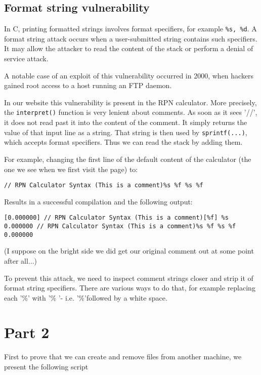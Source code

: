 \documentclass[11pt,journal]{article}
\begin{document}
	\subsection{Format string vulnerability}
	In C, printing formatted strings involves format specifiers, for example \texttt{\%s, \%d}. A format string attack occurs when a user-submitted string contains such specifiers. It may allow the attacker to read the content of the stack or perform a denial of service attack.
	
	A notable case of an exploit of this vulnerability occurred in 2000, when hackers gained root access to a host running an FTP daemon\cite{format string}.
	
	In our website this vulnerability is present in the RPN calculator. More precisely, the \texttt{interpret()} function is very lenient about comments. As soon as it sees '//', it does not read past it into the content of the comment. It simply returns the value of that input line as a string. That string is then used by \texttt{sprintf(...)}, which accepts format specifiers. Thus we can read the stack by adding them.
	
	For example, changing the first line of the default content of the calculator (the one we see when we first visit the page) to:
	
	\texttt{// RPN Calculator Syntax (This is a comment)\%s \%f \%s \%f}
	
	Results in a successful compilation and the following output:
	
	\texttt{[0.000000] // RPN Calculator Syntax (This is a comment)[\%f] \%s 0.000000  // RPN Calculator Syntax (This is a comment)\%s \%f \%s \%f 0.000000}
	
	(I suppose on the bright side we did get our original comment out at some point after all...)
	
	To prevent this attack, we need to inspect comment strings closer and strip it of format string specifiers. There are various ways to do that, for example replacing each '\%' with '\% '- i.e. '\%'followed by a white space.
	
	
	
	\section{Part 2}
	
	First to prove that we can create and remove files from another machine, we present the following script
	
\end{document}
